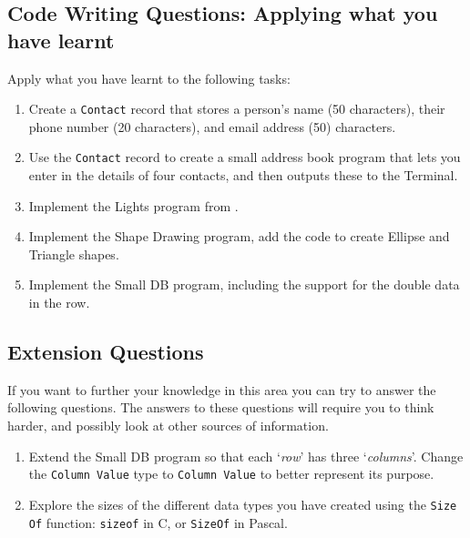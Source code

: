 
\clearpage
\subsection{Code Writing Questions: Applying what you have learnt} %
\label{sub:code_writing_questions_applying_what_you_have_learnt_types}

Apply what you have learnt to the following tasks:

\begin{enumerate}
  \item Create a \texttt{Contact} record that stores a person's name (50 characters), their phone number (20 characters), and email address (50) characters. 
  \item Use the \texttt{Contact} record to create a small address book program that lets you enter in the details of four contacts, and then outputs these to the Terminal.
  \item Implement the Lights program from .
  \item Implement the Shape Drawing program, add the code to create Ellipse and Triangle shapes.
  \item Implement the Small DB program, including the support for the double data in the row.
\end{enumerate}

\bigskip
\subsection{Extension Questions} %
\label{sub:extension_questions_types}

If you want to further your knowledge in this area you can try to answer the following questions. The answers to these questions will require you to think harder, and possibly look at other sources of information.

\begin{enumerate}
  \item Extend the Small DB program so that each `\emph{row}' has three `\emph{columns}'. Change the \texttt{Column Value} type to \texttt{Column Value} to better represent its purpose.
  \item Explore the sizes of the different data types you have created using the \texttt{Size Of} function: \texttt{sizeof} in C, or \texttt{SizeOf} in Pascal.
\end{enumerate}
